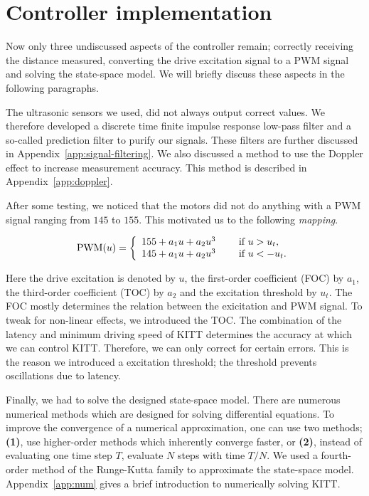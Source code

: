 \documentclass[11pt,titlepage]{report}
\begin{document}
\section{Controller implementation}
Now only three undiscussed aspects of the controller remain; correctly receiving the distance measured, converting the drive excitation signal to a PWM signal and solving the state-space model. We will briefly discuss these aspects in the following paragraphs.

The ultrasonic sensors we used, did not always output correct values. We therefore developed a discrete time finite impulse response low-pass filter and a so-called prediction filter to purify our signals. These filters are further discussed in Appendix~\ref{app:signal-filtering}. We also discussed a method to use the Doppler effect to increase measurement accuracy. This method is described in Appendix~\ref{app:doppler}.

After some testing, we noticed that the motors did not do anything with a PWM signal ranging from $145$ to $155$. This motivated us to the following \textit{mapping}.

\begin{equation} \label{eq:ctrl-mapping}
	\text{PWM}(u) = \left\{ \begin{array}{l l}
		155 + a_1 u + a_2 u^3 & \quad \text{ if } u > u_t, \\
		145 + a_1 u + a_2 u^3 & \quad \text{ if } u < -u_t.
	\end{array} \right.
\end{equation}

Here the drive excitation is denoted by $u$, the first-order coefficient (FOC) by $a_1$, the third-order coefficient (TOC) by $a_2$ and the excitation threshold by $u_t$. The FOC mostly determines the relation between the exicitation and PWM signal. To tweak for non-linear effects, we introduced the TOC. The combination of the latency and minimum driving speed of KITT determines the accuracy at which we can control KITT. Therefore, we can only correct for certain errors. This is the reason we introduced a excitation threshold; the threshold prevents oscillations due to latency.

Finally, we had to solve the designed state-space model. There are numerous numerical methods which are designed for solving differential equations. To improve the convergence of a numerical approximation, one can use two methods; \textbf{(1)}, use higher-order methods which inherently converge faster, or \textbf{(2)}, instead of evaluating one time step $T$, evaluate $N$ steps with time $T/N$. We used a fourth-order method of the Runge-Kutta family to approximate the state-space model. Appendix~\ref{app:num} gives a brief introduction to numerically solving KITT.
\end{document}
